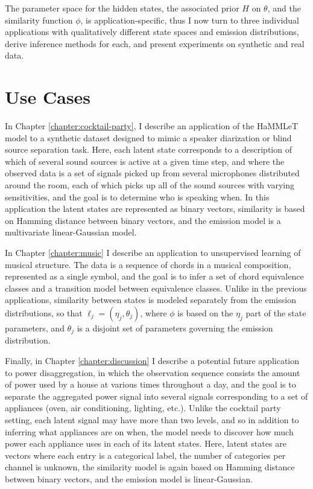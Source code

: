 The parameter space for the hidden states, the associated prior $H$ on
$\theta$, and the similarity function $\phi$, is application-specific,
thus I now turn to three individual applications with qualitatively
different state spaces and emission distributions, derive inference
methods for each, and present experiments on synthetic and real data.

\section{Use Cases}

In Chapter \ref{chapter:cocktail-party}, I describe an application of
the HaMMLeT model to a synthetic dataset designed to mimic a speaker
diarization or blind source separation task. Here, each latent state
corresponds to a description of which of several sound sources is
active at a given time step, and where the observed data is a set of
signals picked up from several microphones distributed around the
room, each of which picks up all of the sound sources with varying
sensitivities, and the goal is to determine who is speaking when.  In
this application the latent states are represented as binary vectors,
similarity is based on Hamming distance between binary vectors, and
the emission model is a multivariate linear-Gaussian model.

In Chapter \ref{chapter:music} I describe an application to
unsupervised learning of musical structure.  The data is a sequence of
chords in a musical composition, represented as a single symbol, and
the goal is to infer a set of chord equivalence classes and a
transition model between equivalence classes.  Unlike in the previous
applications, similarity between states is modeled separately from the
emission distributions, so that $\ell_j = (\eta_j, \theta_j)$, where
$\phi$ is based on the $\eta_j$ part of the state parameters, and
$\theta_j$ is a disjoint set of parameters governing the emission
distribution.

Finally, in Chapter \ref{chapter:discussion} I describe a potential future
application to power disaggregation, in which the observation sequence consists the amount of
power used by a house at various times throughout a day, and the goal
is to separate the aggregated power signal into several signals
corresponding to a set of appliances (oven, air conditioning,
lighting, etc.).  Unlike the cocktail party setting, each latent
signal may have more than two levels, and so in addition to inferring
what appliances are on when, the model needs to discover how much
power each appliance uses in each of its latent states.  Here, latent
states are vectors where each entry is a categorical label, the number
of categories per channel is unknown, the similarity model is again
based on Hamming distance between binary vectors, and the emission
model is linear-Gaussian.

